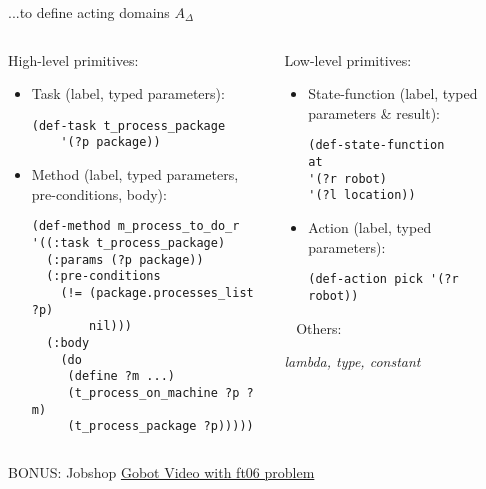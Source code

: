 \begin{frame}[fragile]{...to define acting domains $A_\Delta$}
    \setlength{\leftmargini}{0pt}
    \begin{columns}
        \begin{column}{0.5\textwidth}
            High-level primitives:
            \begin{itemize}
                \footnotesize
                \item Task (label, typed parameters):
                \tiny
                \begin{lstlisting}
(def-task t_process_package
    '(?p package))
                \end{lstlisting}
                \footnotesize
                \item Method (label, typed parameters, pre-conditions, body):
                \tiny
                \begin{lstlisting}
(def-method m_process_to_do_r
'((:task t_process_package)
  (:params (?p package))
  (:pre-conditions
    (!= (package.processes_list ?p)
        nil)))
  (:body
    (do
     (define ?m ...)
     (t_process_on_machine ?p ?m)
     (t_process_package ?p)))))    
                \end{lstlisting}
            \end{itemize}
        \end{column}

        \begin{column}{0.5\textwidth}
            Low-level primitives:
            \begin{itemize}
            \footnotesize
            \item State-function (label, typed parameters \& result):
            \tiny
            \begin{lstlisting}
(def-state-function
at
'(?r robot)
'(?l location))
            \end{lstlisting}
            \footnotesize
            \item Action (label, typed parameters):
            \tiny
            \begin{lstlisting}
(def-action pick '(?r robot))
                \end{lstlisting}
            \end{itemize}

            ~
        \normalsize
        Others:
        
        \textit{lambda, type, constant}
        \end{column}

        

    \end{columns}
    

\end{frame}


\begin{frame}[c]{BONUS: Jobshop}
\centering
\LARGE
\href{https://youtu.be/nWGewFgXYcI}{Gobot Video with ft06 problem}
\end{frame}

